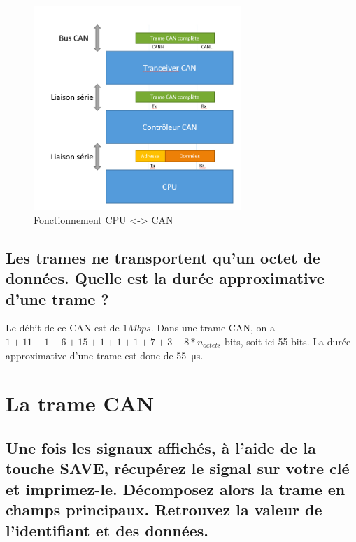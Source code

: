 \documentclass[12pt]{article}
\begin{document}
\begin{figure}[H]
\centering
\includegraphics[width=0.7\textwidth]{schema.jpg}
\caption{Fonctionnement CPU <-> CAN}
\end{figure}

\subsection{Les trames ne transportent qu'un octet de données. Quelle est la durée approximative d'une trame ?}

Le débit de ce CAN est de $1Mbps$. Dans une trame CAN, on a $1+11+1+6+15+1+1+1+7+3+8*n_{octets}$ bits, soit ici 55 bits. La durée approximative d'une trame est donc de \SI{55}{\micro\second}.

\section{La trame CAN}

\subsection{Une fois les signaux affichés, à l'aide de la touche SAVE, récupérez le signal sur votre clé et imprimez-le. Décomposez alors la trame en champs principaux. Retrouvez la valeur de l'identifiant et des données.}
\end{document}
